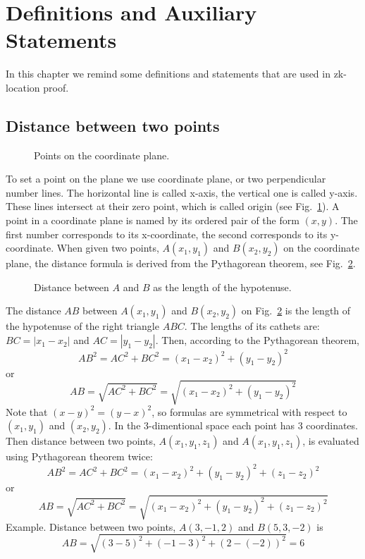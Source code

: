 \documentclass{article}
\begin{document}
\section{Definitions and Auxiliary Statements}

In this chapter we remind some definitions and statements that are used in zk-location proof.

\subsection{Distance between two points}  %

\begin{figure}
  \centering
  \def\svgwidth{200bp}
  
\caption{Points on the coordinate plane.}
\label{fig-2}
\end{figure}
%
To set a point on the plane we use coordinate plane, or two perpendicular number lines.
The horizontal line is called x-axis, the vertical one is called y-axis.
These lines intersect at their zero point, which is called origin (see Fig.~\ref{fig-2}).
A point in a coordinate plane is named by its ordered pair of the form $(x, y)$.
The first number corresponds to its x-coordinate, the second corresponds to its y-coordinate.
When given two points, $A(x_1, y_1)$ and $B(x_2, y_2)$ on the coordinate plane, the distance formula is derived from the Pythagorean theorem, see Fig.~\ref{fig-3}.
\begin{figure}
  \centering
  \def\svgwidth{200bp}
  
\caption{Distance between $A$ and $B$ as the length of the hypotenuse.}
\label{fig-3}
\end{figure}
%
The distance $AB$ between $A(x_1, y_1)$ and $B(x_2, y_2)$ on Fig.~\ref{fig-3} is the length of the hypotenuse of the right triangle $ABC$.
The lengths of its cathets are: $BC = |x_1 - x_2|$ and $AC = |y_1 - y_2|$.
 Then, according to the Pythagorean theorem,
\begin{equation}
  AB^2 = AC^2 + BC^2 = (x_1 - x_2)^2 + (y_1 - y_2)^2
\end{equation}
or
\begin{equation}
  AB = \sqrt{AC^2 + BC^2} = \sqrt{(x_1 - x_2)^2 + (y_1 - y_2)^2}
\end{equation}
Note that $(x - y)^2 = (y - x)^2$, so formulas are symmetrical with respect to $(x_1, y_1)$ and $(x_2, y_2)$.
In the 3-dimentional space each point has 3 coordinates.
Then distance between two points, $A(x_1, y_1, z_1)$ and $A(x_1, y_1, z_1)$, is evaluated using Pythagorean theorem twice:
\begin{equation}
  AB^2 = AC^2 + BC^2 = (x_1 - x_2)^2 + (y_1 - y_2)^2 + (z_1 - z_2)^2
\end{equation}
or
\begin{equation}
  AB = \sqrt{AC^2 + BC^2} = \sqrt{(x_1 - x_2)^2 + (y_1 - y_2)^2 + (z_1 - z_2)^2}
\end{equation}
Example.
Distance between two points, $A(3, -1, 2)$ and $B(5, 3, -2)$ is
\begin{equation}
  AB = \sqrt{(3 - 5)^2 + (-1 - 3)^2 + (2 - (-2))^2} = 6
\end{equation}
\end{document}
